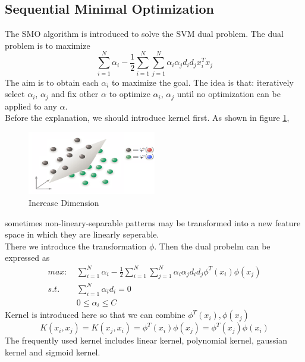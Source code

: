 \documentclass[twocolumn, a4paper]{article}
\begin{document}
\subsection{Sequential Minimal Optimization}
The SMO algorithm is introduced to solve the SVM dual problem. The dual problem is to maximize\begin{equation}
\nonumber
  \sum_{i=1}^N\alpha_i-\frac{1}{2}\sum_{i=1}^N\sum_{j=1}^N\alpha_i\alpha_jd_id_jx_i^Tx_j
\end{equation}
The aim is to obtain each $\alpha_i$ to maximize the goal. The idea is that: iteratively select $\alpha_i$, $\alpha_j$ and fix other $\alpha$ to optimize $\alpha_i$, $\alpha_j$ until no optimization can be applied to any $\alpha$.\\
Before the explanation, we should introduce kernel first. As shown in figure \ref{fig:hig},
\begin{figure}[htb]
  \centering
  \includegraphics[width=0.5\textwidth]{high.png}
  \caption{Increase Dimension}
  \label{fig:hig}
\end{figure}
sometimes non-lineary-separable patterns may be transformed into a new feature space in which they are linearly seperable.\\
There we introduce the transformation $\phi$. Then the dual probelm can be expressed as
\begin{equation}
\begin{aligned}
\nonumber
  max:\ &\sum_{i=1}^N\alpha_i-\frac{1}{2}\sum_{i=1}^N\sum_{j=1}^N\alpha_i\alpha_jd_id_j\phi^T(x_i)\phi(x_j)\\
  s.t.\ \ &\sum_{i=1}^N\alpha_id_i=0\\
  &0\le \alpha_i\le C
\end{aligned}
\end{equation}
Kernel is introduced here so that we can combine $\phi^T(x_i), \phi(x_j)$
\begin{equation}
\nonumber
  K(x_i,x_j) = K(x_j,x_i)=\phi^T(x_i)\phi(x_j)=\phi^T(x_j) \phi(x_i)
\end{equation}
The frequently used kernel includes linear kernel, polynomial kernel, gaussian kernel and sigmoid kernel.\\
\end{document}
